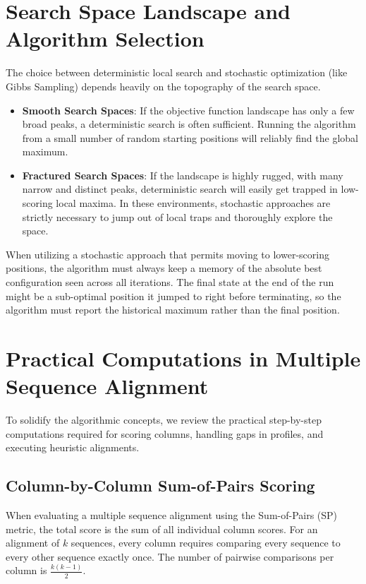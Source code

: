 \section{Search Space Landscape and Algorithm Selection}

The choice between deterministic local search and stochastic optimization (like Gibbs Sampling) depends heavily on the topography of the search space.

\begin{itemize}
  \item \textbf{Smooth Search Spaces}: If the objective function landscape has only a few broad peaks, a deterministic search is often sufficient. Running the algorithm from a small number of random starting positions will reliably find the global maximum.
  \item \textbf{Fractured Search Spaces}: If the landscape is highly rugged, with many narrow and distinct peaks, deterministic search will easily get trapped in low-scoring local maxima. In these environments, stochastic approaches are strictly necessary to jump out of local traps and thoroughly explore the space.
\end{itemize}

\sta When utilizing a stochastic approach that permits moving to lower-scoring positions, the algorithm must always keep a memory of the absolute best configuration seen across all iterations. The final state at the end of the run might be a sub-optimal position it jumped to right before terminating, so the algorithm must report the historical maximum rather than the final position.

\section{Practical Computations in Multiple Sequence Alignment}

To solidify the algorithmic concepts, we review the practical step-by-step computations required for scoring columns, handling gaps in profiles, and executing heuristic alignments.

\subsection{Column-by-Column Sum-of-Pairs Scoring}
When evaluating a multiple sequence alignment using the Sum-of-Pairs (SP) metric, the total score is the sum of all individual column scores. For an alignment of $k$ sequences, every column requires comparing every sequence to every other sequence exactly once. The number of pairwise comparisons per column is $\frac{k(k-1)}{2}$.

